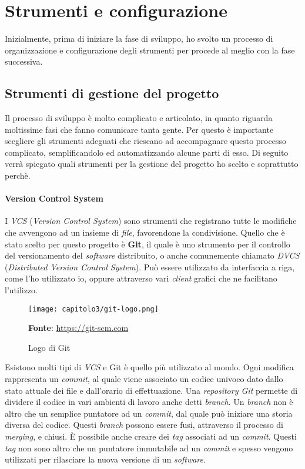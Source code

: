 
\section{Strumenti e configurazione}
Inizialmente, prima di iniziare la fase di sviluppo, ho svolto un processo di organizzazione e configurazione degli strumenti per procede al meglio con la fase successiva. 

\subsection{Strumenti di gestione del progetto}
Il processo di sviluppo è molto complicato e articolato, in quanto riguarda moltissime fasi che fanno comunicare tanta gente. Per questo è importante scegliere gli strumenti adeguati che riescano ad accompagnare questo processo complicato, semplificandolo ed automatizzando alcune parti di esso. Di seguito verrà spiegato quali strumenti per la gestione del progetto ho scelto e soprattutto perchè.

\paragraph{Version Control System}
I \textit{VCS} (\textit{Version Control System}) sono strumenti che registrano tutte le modifiche che avvengono ad un insieme di \textit{file}, favorendone la condivisione. Quello che è stato scelto per questo progetto è \textbf{Git}, il quale è uno strumento per il controllo del versionamento del \textit{software} distribuito, o anche comunemente chiamato \textit{DVCS} (\textit{Distributed Version Control System}). Può essere utilizzato da interfaccia a riga, come l'ho utilizzato io, oppure attraverso vari \textit{client} grafici che ne facilitano l'utilizzo.

\begin{figure}[h!]
  \centering
  \texttt{[image: capitolo3/git-logo.png]}
  \caption{Logo di Git}
  \textbf{Fonte}: \href{https://git-scm.com}{https://git-scm.com}
\end{figure}

Esistono molti tipi di \textit{VCS} e Git è quello più utilizzato al mondo. Ogni modifica rappresenta un \textit{commit}, al quale viene associato un codice univoco dato dallo stato attuale dei file e dall'orario di effettuazione. Una \textit{repository Git} permette di dividere il codice in vari ambienti di lavoro anche detti \textit{branch}. Un \textit{branch} non è altro che un semplice puntatore ad un \textit{commit}, dal quale può iniziare una storia diversa del codice. Questi \textit{branch} possono essere fusi, attraverso il processo di \textit{merging}, e chiusi. È possibile anche creare dei \textit{tag} associati ad un \textit{commit}. Questi \textit{tag} non sono altro che un puntatore immutabile ad un \textit{commit} e spesso vengono utilizzati per rilasciare la nuova versione di un \textit{software}. \\

